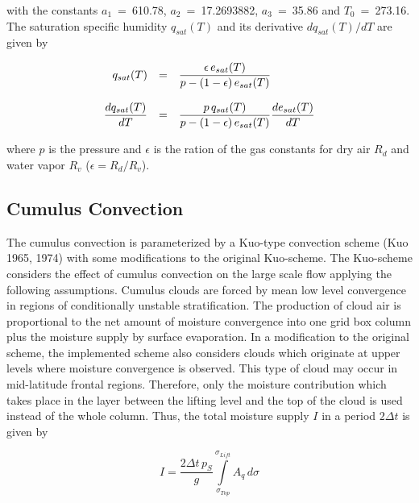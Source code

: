 with the constants $a_1$~=~610.78,
$a_2$~=~17.2693882, $a_3$~=~35.86 and
$T_0$~=~273.16. The
saturation specific humidity $q_{sat}(T)$ and its
derivative $dq_{sat}(T)/dT$ are given by

\begin{equation}\label{qsat}
\begin{array}{rcl}
\displaystyle q_{sat}(T) & = & \displaystyle \frac{\epsilon \,
e_{sat}(T)}{p-(1-\epsilon  )\,  e_{sat}
(T)} \\
&&\\
\displaystyle \frac{dq_{sat}(T)}{dT} & = & \displaystyle \frac{p \,
q_{sat}(T)}{p-(1-\epsilon)\,  e_{sat}
(T)} \frac{de_{sat}(T)}{dT}\\
\end{array}
\end{equation}

where $p$ is the pressure and  $\epsilon$ is the ration
of the gas constants
for dry air $R_d$ and water vapor $R_v$ ($\epsilon =
R_d / R_v$). 


\subsection{Cumulus Convection}

The cumulus convection is parameterized by a
Kuo-type convection scheme (Kuo 1965, 1974)
with some modifications to the original Kuo-scheme.
The Kuo-scheme considers the effect of
cumulus convection on the large scale flow applying
the following assumptions. Cumulus
clouds are forced by mean low level convergence in
regions of conditionally unstable
stratification. The production of cloud air is
proportional to the net amount of moisture
convergence into one grid box column plus the
moisture supply by surface evaporation. In a
modification to the original scheme, the implemented
scheme also considers clouds which
originate at upper levels where moisture convergence
is observed. This type of cloud may occur
in mid-latitude frontal regions. Therefore, only the
moisture contribution which takes place in
the layer between the lifting level and the top of the
cloud is used instead of the whole column.
Thus, the total moisture supply $I$ in a period $2
\Delta t$ is given by 

\begin{equation}\label{cli}
I= \frac{2 \Delta t \, p_S}{g}
\int\limits_{\sigma_{Top}}^{\sigma_{Lift}} A_q \, d
\sigma
\end{equation}

